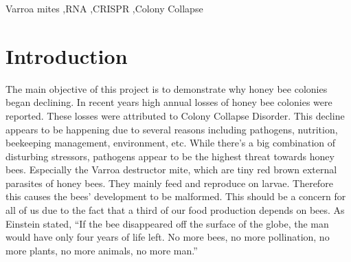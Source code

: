 \documentclass[final,5p,times,twocolumn,authoryear]{elsarticle}
\begin{document}
\begin{frontmatter}
\begin{abstract}
\end{abstract}



\begin{keyword}
Varroa mites \sep RNA \sep CRISPR \sep Colony Collapse



\end{keyword}


\end{frontmatter}




\section{Introduction}
\label{introduction}

The main objective of this project is to demonstrate why honey bee colonies began declining. In recent years high annual losses of honey bee colonies were reported. These losses were attributed to Colony Collapse Disorder. This decline appears to be happening due to several reasons including pathogens, nutrition, beekeeping management, environment, etc. While there’s a big combination of disturbing stressors, pathogens appear to be the highest threat towards honey bees. Especially the Varroa destructor mite, which are tiny red brown external parasites of honey bees. They mainly feed and reproduce on larvae. Therefore this causes the bees' development to be malformed. This should be a concern for all of us due to the fact that a third of our food production depends on bees. As Einstein stated, “If the bee disappeared off the surface of the globe, the man would have only four years of life left. No more bees, no more pollination, no more plants, no more animals, no more man.” 
\end{document}

